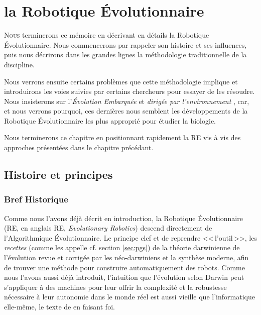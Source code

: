 \chapter{la Robotique \'Evolutionnaire}\label{ch:RE}
\lettrine[lines=2]{N}{ous} terminerons ce mémoire en décrivant en détails la Robotique \'Evolutionnaire. Nous commencerons par rappeler son histoire et ses influences, puis nous décrirons dans les grandes lignes la méthodologie traditionnelle de la discipline.

Nous verrons ensuite certains problèmes que cette méthodologie implique et introduirons les voies suivies par certains chercheurs pour essayer de les résoudre. Nous insisterons sur l'\emph{\'Evolution Embarquée} \citep{watson02embodiedevolutiondistributingevolutionaryalgorithmpopulationrobots} et \emph{dirigée par l'environnement} \citep{bredeche2012environmentdrivendistributedevolutionaryadaptation}, car, et nous verrons pourquoi, ces dernières nous semblent les développements de la Robotique \'Evolutionnaire les plus approprié pour étudier la biologie.

Nous terminerons ce chapitre en positionnant rapidement la RE vis à vis des approches présentées dans le chapitre précédant.



\section{Histoire et principes}\label{sec:re}
\subsection{Bref Historique}

Comme nous l'avons déjà décrit en introduction, la Robotique \'Evolutionnaire (RE, en anglais RE, \emph{Evolutionary Robotics}) descend directement de l'Algorithmique Évolutionnaire. Le principe clef et de reprendre <<\,l'outil\,>>, les \emph{recettes} (comme les appelle \cite{godfrey2009darwinian} cf. section \ref{sec:pgs}) de la théorie darwinienne de l'évolution revue et corrigée par les néo-darwiniens et la synthèse moderne, afin de trouver une méthode pour construire automatiquement des robots.
Comme nous l'avons aussi déjà introduit, l'intuition que l'évolution selon Darwin peut s'appliquer à des machines pour leur offrir la complexité et la robustesse nécessaire à leur autonomie dans le monde réel est aussi vieille que l'informatique elle-même, le texte de \cite{turing50computingmachineryintelligence} en faisant foi.

